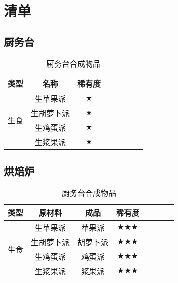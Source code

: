 \section{清单}
\subsection{厨务台}

\begin{center}
    \setlength{\tabcolsep}{4mm}
    \begin{longtable}{c|c|ccc|ccc}
        \caption{厨务台合成物品} \\
        \toprule
        \textbf{类型} & \textbf{名称} & \textbf{稀有度} \\
        \midrule
        \multirow{4}{*}{生食} & 生苹果派 & $\bigstar$ \\
         & 生胡萝卜派 & $\bigstar$ \\
         & 生鸡蛋派 & $\bigstar$ \\
         & 生浆果派 & $\bigstar$ \\
        \bottomrule
    \end{longtable}
\end{center}

\subsection{烘焙炉}

\begin{center}
    \setlength{\tabcolsep}{4mm}
    \begin{longtable}{c|c|ccc|ccc}
        \caption{厨务台合成物品} \\
        \toprule
        \textbf{类型} & \textbf{原材料} & \textbf{成品} & \textbf{稀有度} \\
        \midrule
        \multirow{4}{*}{生食} & 生苹果派 & 苹果派 & $\bigstar\bigstar\bigstar$ \\
         & 生胡萝卜派 & 胡萝卜派 & $\bigstar\bigstar\bigstar$ \\
         & 生鸡蛋派 & 鸡蛋派 & $\bigstar\bigstar\bigstar$ \\
         & 生浆果派 & 浆果派 & $\bigstar\bigstar\bigstar$ \\
        \bottomrule
    \end{longtable}
\end{center}